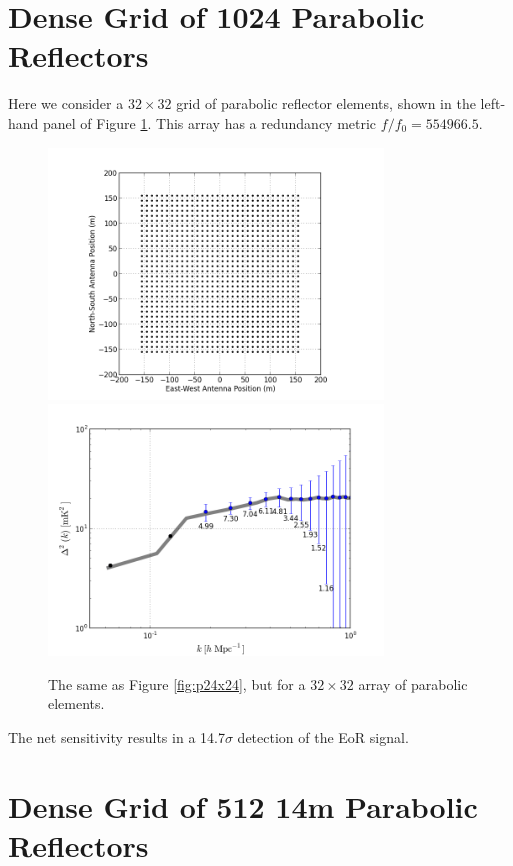 \documentclass[preprint]{aastex}
\begin{document}
\section{Dense Grid of 1024 Parabolic Reflectors}

Here we consider 
a $32\times32$ grid of parabolic reflector elements, shown in the left-hand
panel of Figure \ref{fig:p32x32}.  This array has a redundancy metric
$f/f_0 = 554966.5$.  
\begin{figure}[ht]
\centering
\includegraphics[width=3.5in,trim=2cm 0cm 0cm 0cm]{figures/g32x32.png}\includegraphics[width=3.5in,trim=2cm 0cm 0cm 0cm]{figures/g32x32-sense.png}
\caption{The same as Figure \ref{fig:p24x24}, but for a $32\times32$ array
of parabolic elements.}
\label{fig:p32x32}
\end{figure}
The net sensitivity results in a 14.7$\sigma$ detection of the EoR signal.

\section{Dense Grid of 512 14m Parabolic Reflectors}
\end{document}
